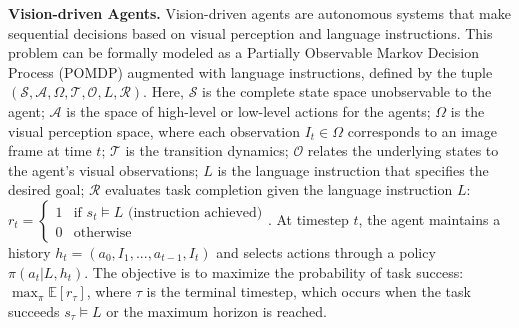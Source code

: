 \textbf{Vision-driven Agents.}\label{sec:def_vision_agent}
Vision-driven agents are autonomous systems that make sequential decisions based on visual perception and language instructions. This problem can be formally modeled as a Partially Observable Markov Decision Process (POMDP) augmented with language instructions, defined by the tuple $(\mathcal{S}, \mathcal{A}, \Omega, \mathcal{T}, \mathcal{O}, L, \mathcal{R})$. Here, $\mathcal{S}$ is the complete state space unobservable to the agent; $\mathcal{A}$ is the space of high-level or low-level actions for the agents; $\Omega$ is the visual perception space, where each observation $I_t \in \Omega$ corresponds to an image frame at time $t$; $\mathcal{T}$ is the transition dynamics; $\mathcal{O}$ relates the underlying states to the agent's visual observations; $L$ is the language instruction that specifies the desired goal; $\mathcal{R}$ evaluates task completion given the language instruction $L$: $r_t = \begin{cases}
1 & \text{if } s_t \models L \text{ (instruction achieved)} \\
0 & \text{otherwise}\end{cases}$.
At timestep $t$, the agent maintains a history $h_t = (a_0, I_1, ..., a_{t-1}, I_t)$ and selects actions through a policy $\pi(a_t|L, h_t)$. The objective is to maximize the probability of task success: $\max_\pi \mathbb{E}\left[r_\tau\right]$, where $\tau$ is the terminal timestep, which occurs when the task succeeds \(s_\tau \models L\) or the maximum horizon is reached. 



